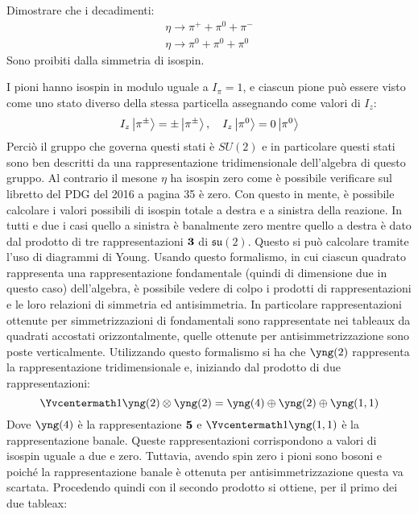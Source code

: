 \documentclass[../main.tex]{subfiles}
\begin{document}
	\begin{ese}[13.3]
		Dimostrare che i decadimenti:
		\begin{gather}
			\label{eqn:deceta1}
			\eta \to \pi^{+}+\pi^{0}+\pi^{-} \\
			\label{eqn:deceta2}
			\eta \to \pi^{0}+\pi^{0}+\pi^{0}
		\end{gather}
		Sono proibiti dalla simmetria di isospin.
	\end{ese}
	\begin{svol}
		I pioni hanno isospin in modulo uguale a $ I_{\pi}=1 $, e ciascun pione può essere visto come uno stato diverso della stessa particella assegnando come valori di $ I_{z} $:
		\begin{gather}
		I_{z}\ket{\pi^{\pm}}=\pm\ket{\pi^{\pm}},\quad I_{z}\ket{\pi^{0}}=0\ket{\pi^{0}}
		\end{gather}
		Perciò il gruppo che governa questi stati è $ SU(2) $ e in particolare questi stati sono ben descritti da una rappresentazione tridimensionale dell'algebra di questo gruppo. Al contrario il mesone $ \eta $ ha isospin zero come è possibile verificare sul libretto del PDG del 2016 a pagina 35 è zero. Con questo in mente, è possibile calcolare i valori possibili di isospin totale a destra e a sinistra della reazione. In tutti e due i casi quello a sinistra è banalmente zero mentre quello a destra è dato dal prodotto di tre rappresentazioni $ \bold{3} $ di $ \mathfrak{su}(2) $. Questo si può calcolare tramite l'uso di diagrammi di Young. Usando questo formalismo, in cui ciascun quadrato rappresenta una rappresentazione fondamentale (quindi di dimensione due in questo caso) dell'algebra, è possibile vedere di colpo i prodotti di rappresentazioni e le loro relazioni di simmetria ed antisimmetria. In particolare rappresentazioni ottenute per simmetrizzazioni di fondamentali sono rappresentate nei tableaux da quadrati accostati orizzontalmente, quelle ottenute per antisimmetrizzazione sono poste verticalmente. Utilizzando questo formalismo si ha che $ \yng(2) $ rappresenta la rappresentazione tridimensionale e, iniziando dal prodotto di due rappresentazioni:
		\begin{equation}
		\Yvcentermath1
			\yng(2)\otimes\yng(2)=\yng(4)\oplus\yng(2)\oplus\yng(1,1)
		\end{equation}
		Dove $ \yng(4) $ è la rappresentazione $ \bold{5} $ e $\Yvcentermath1\yng(1,1)$ è la rappresentazione banale. Queste rappresentazioni corrispondono a valori di isospin uguale a due e zero. Tuttavia, avendo spin zero i pioni sono bosoni e poiché la rappresentazione banale è ottenuta per antisimmetrizzazione questa va scartata. Procedendo quindi con il secondo prodotto si ottiene, per il primo dei due tableax:

\end{svol}
\end{document}
